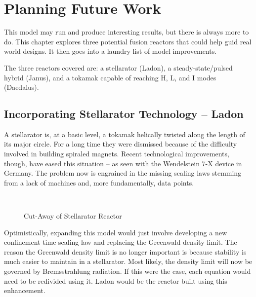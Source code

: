 %
%
%
%
%
%
%
%

\chapter{Planning Future Work}

This model may run and produce interesting results, but there is always more to do. This chapter explores three potential fusion reactors that could help guid real world designs. It then goes into a laundry list of model improvements.

The three reactors covered are: a stellarator (Ladon), a steady-state/pulsed hybrid (Janus), and a tokamak capable of reaching H, L, and I modes (Daedalus). 

\section{Incorporating Stellarator Technology -- Ladon}

A stellarator is, at a basic level, a tokamak helically twisted along the length of its major circle. For a long time they were dismissed because of the difficulty involved in building spiraled magnets.  Recent technological improvements, though, have eased this situation -- as seen with the Wendelstein 7-X device in Germany. The problem now is engrained in the missing scaling laws stemming from a lack of machines and, more fundamentally, data points.

\begin{figure}
	\centering
	\begin{adjustbox}{width=0.75\textwidth}
		
	\end{adjustbox}
	\caption{Cut-Away of Stellarator Reactor} ~\\
\end{figure}

Optimistically, expanding this model would just involve developing a new confinement time scaling law and replacing the Greenwald density limit. The reason the Greenwald density limit is no longer important is because stability is much easier to maintain in a stellarator. Most likely, the density limit will now be governed by Bremsstrahlung radiation. If this were the case, each equation would need to be redivided using it. Ladon would be the reactor built using this enhancement.

